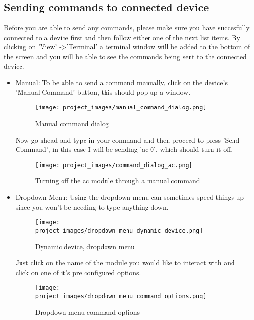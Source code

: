 \subsection{Sending commands to connected device}

	Before you are able to send any commands, please make sure you have succesfully connected to a device first and then follow either one of the next list items.
	By clicking on 'View' -\textgreater 'Terminal' a terminal window will be added to the bottom of the screen and you will be able to see the commands being sent to the connected device.

	\begin{itemize}
	\item Manual:
	\newline To be able to send a command manually, click on the device's 'Manual Command' button, this should pop up a window.

	\begin{figure}[H]
	\centering
	\texttt{[image: project\_images/manual\_command\_dialog.png]}
	 \caption{Manual command dialog}
	 \label{fig:manual command dialog}
	\end{figure}

	Now go ahead and type in your command and then proceed to press 'Send Command', in this case I will be sending 'ac 0', which should turn it off.

	\begin{figure}[H]
	\centering
	\texttt{[image: project\_images/command\_dialog\_ac.png]}
	 \caption{Turning off the ac module through a manual command}
	 \label{fig:manual command ac}
	\end{figure}

	\item Dropdown Menu:
	\newline Using the dropdown menu can sometimes speed things up since you won't be needing to type anything down.
	
	\begin{figure}[H]
	\centering
	\texttt{[image: project\_images/dropdown\_menu\_dynamic\_device.png]}
	 \caption{Dynamic device, dropdown menu}
	 \label{fig:dropdown menu dynamic device}
	\end{figure}

	Just click on the name of the module you would like to interact with and click on one of it's pre configured options.

	\begin{figure}[H]
	\centering
	\texttt{[image: project\_images/dropdown\_menu\_command\_options.png]}
	 \caption{Dropdown menu command options}
	 \label{fig:dropdown menu command options}
	\end{figure}
	\end{itemize}

